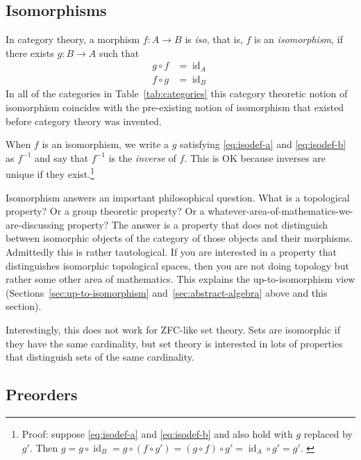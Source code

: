 \documentclass[11pt]{article}
\DeclareMathOperator{\idfun}{id}
\begin{document}
\subsection{Isomorphisms}
\label{sec:iso}

In category theory, a morphism $f : A \to B$ is \emph{iso},
that is, $f$ is an \emph{isomorphism}, if there exists $g : B \to A$ such that
\begin{subequations}
\begin{align}
   g \circ f & = \idfun_A
   \label{eq:isodef-a}
   \\
   f \circ g & = \idfun_B
   \label{eq:isodef-b}
\end{align}
\end{subequations}
In all of the categories in Table~\ref{tab:categories} this category theoretic
notion of isomorphism coincides with the pre-existing notion of isomorphism
that existed before category theory was invented.

When $f$ is an isomorphism, we write a $g$ satisfying \eqref{eq:isodef-a}
and \eqref{eq:isodef-b} as $f^{-1}$ and say that $f^{-1}$ is the \emph{inverse}
of $f$.  This is OK because inverses are unique if they exist.\footnote{Proof:
suppose
\eqref{eq:isodef-a} and \eqref{eq:isodef-b} and also hold with $g$ replaced
by $g'$.
Then $g = g \circ \idfun_B = g \circ (f \circ g') = (g \circ f) \circ g'
= \idfun_A \circ g' = g'$.
\label{foot:inverse}}

Isomorphism answers an important philosophical question.  What is a
topological property?  Or a group theoretic property?  Or a
whatever-area-of-mathematics-we-are-discussing property?
The answer is a property that does not distinguish between isomorphic
objects of the category of those objects and their morphisms.
Admittedly this is rather tautological.  If you are interested in a property
that distinguishes isomorphic topological spaces, then you are not doing
topology but rather some other area of mathematics.
This explains the up-to-isomorphism view (Sections~\ref{sec:up-to-isomorphism}
and~\ref{sec:abstract-algebra} above and this section).

Interestingly, this does not work for ZFC-like set theory.
Sets are isomorphic if they have the same cardinality,
but set theory is interested in lots of properties that distinguish
sets of the same cardinality.

\subsection{Preorders}
\label{sec:preorder}
\end{document}
